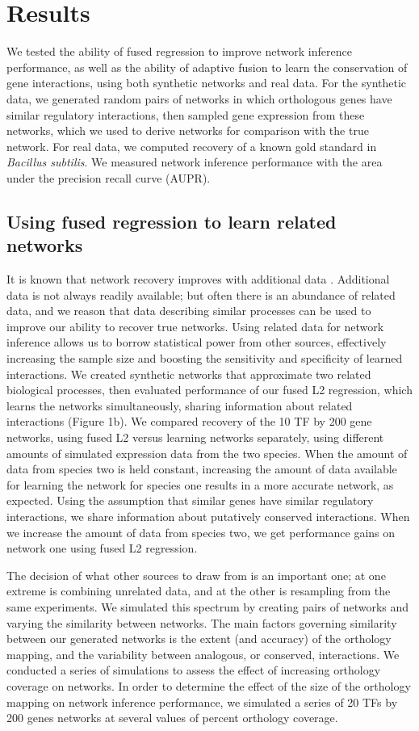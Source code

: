 \documentclass[11pt]{article}
\begin{document}
\section{Results}
We tested the ability of fused regression to improve network inference performance, as well as the ability of adaptive fusion to learn the conservation of gene interactions, using both synthetic networks and real data. For the synthetic data, we generated random pairs of networks in which orthologous genes have similar regulatory interactions, then sampled gene expression from these networks, which we used to derive networks for comparison with the true network. For real data, we computed recovery of a known gold standard in \textit{Bacillus subtilis}. We measured network inference performance with the area under the precision recall curve (AUPR). 

\subsection{Using fused regression to learn related networks}
It is known that network recovery improves with additional data \cite{bar-joseph_computational_2003}. Additional data is not always readily available; but often there is an abundance of related data, and we reason that data describing similar processes can be used to improve our ability to recover true networks. Using related data for network inference allows us to borrow statistical power from other sources, effectively increasing the sample size and boosting the sensitivity and specificity of learned interactions. We created synthetic networks that approximate two related biological processes, then evaluated performance of our fused L2 regression, which learns the networks simultaneously, sharing information about related interactions (Figure 1b). We compared recovery of the 10 TF by 200 gene networks, using fused L2 versus learning networks separately, using different amounts of simulated expression data from the two species. When the amount of data from species two is held constant, increasing the amount of data available for learning the network for species one results in a more accurate network, as expected. Using the assumption that similar genes have similar regulatory interactions, we share information about putatively conserved interactions. When we increase the amount of data from species two, we get performance gains on network one using fused L2 regression. 

The decision of what other sources to draw from is an important one; at one extreme is combining unrelated data, and at the other is resampling from the same experiments. We simulated this spectrum by creating pairs of networks and varying the similarity between networks. The main factors governing similarity between our generated networks is the extent (and accuracy) of the orthology mapping, and the variability between analogous, or conserved, interactions. We conducted a series of simulations to assess the effect of increasing orthology coverage on networks. In order to determine the effect of the size of the orthology mapping on network inference performance, we simulated a series of 20 TFs by 200 genes networks at several values of percent orthology coverage. 
\end{document}
